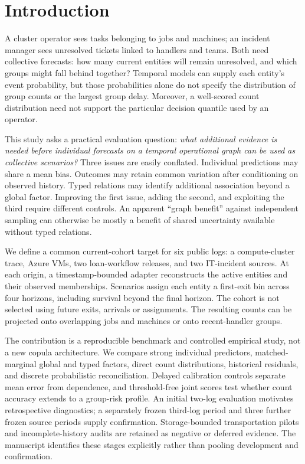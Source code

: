 \section{Introduction}
A cluster operator sees tasks belonging to jobs and machines; an incident
manager sees unresolved tickets linked to handlers and teams. Both need
collective forecasts: how many current entities
will remain unresolved, and which groups might fall behind together? Temporal
models can supply each entity's event probability, but those probabilities
alone do not specify the distribution of group counts or the largest group
delay. Moreover, a well-scored count distribution need not support the
particular decision quantile used by an operator.

This study asks a practical evaluation question: \emph{what additional evidence
is needed before individual forecasts on a temporal operational graph can be
used as collective scenarios?} Three issues are easily conflated. Individual
predictions may share a mean bias. Outcomes may retain common variation after
conditioning on observed history. Typed relations may identify additional
association beyond a global factor. Improving the first issue, adding the
second, and exploiting the third require different controls. An apparent
``graph benefit'' against independent sampling can otherwise be mostly a
benefit of shared uncertainty available without typed relations.

We define a common current-cohort target for six public logs: a compute-cluster
trace, Azure VMs, two loan-workflow releases, and two IT-incident sources.
At each origin, a timestamp-bounded
adapter reconstructs the active entities and their observed memberships.
Scenarios assign each entity a first-exit bin across four horizons, including
survival beyond the final horizon. The cohort is not selected using future
exits, arrivals or assignments. The resulting counts can be projected onto
overlapping jobs and machines or onto recent-handler groups.

The contribution is a reproducible benchmark and controlled empirical study,
not a new copula architecture. We compare strong individual predictors,
matched-marginal global and typed factors, direct count distributions,
historical residuals, and discrete probabilistic reconciliation. Delayed
calibration controls separate mean error from dependence, and threshold-free
joint scores test whether count accuracy extends to a group-risk profile.
An initial two-log evaluation motivates retrospective diagnostics; a separately
frozen third-log period and three further frozen source periods supply
confirmation. Storage-bounded transportation pilots and incomplete-history
audits are retained as negative or deferred evidence. The manuscript identifies
these stages explicitly rather than pooling development and confirmation.

